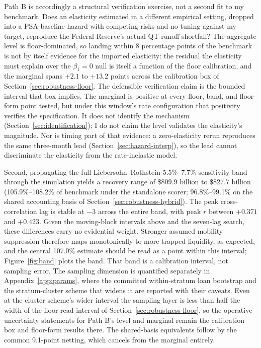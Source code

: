 \documentclass[12pt]{article}
\begin{document}
Path B is accordingly a structural verification exercise, not a second fit to my benchmark. Does an elasticity estimated in a different empirical setting, dropped into a PSA-baseline hazard with competing risks and no tuning against my target, reproduce the Federal Reserve's actual QT runoff shortfall? The aggregate level is floor-dominated, so landing within 8 percentage points of the benchmark is not by itself evidence for the imported elasticity: the residual the elasticity must explain over the $\beta_1 = 0$ null is itself a function of the floor calibration, and the marginal spans $+2.1$ to $+13.2$ points across the calibration box of Section~\ref{sec:robustness-floor}. The defensible verification claim is the bounded interval that box implies. The marginal is positive at every floor, band, and floor-form point tested, but under this window's rate configuration that positivity verifies the specification. It does not identify the mechanism (Section~\ref{sec:identification}); I do not claim the level validates the elasticity's magnitude. Nor is timing part of that evidence: a zero-elasticity rerun reproduces the same three-month lead (Section~\ref{sec:hazard-interp}), so the lead cannot discriminate the elasticity from the rate-inelastic model.

Second, propagating the full Liebersohn--Rothstein 5.5\%--7.7\% sensitivity band through the simulation yields a recovery range of \$809.9 billion to \$827.7 billion (105.9\%--108.2\% of benchmark under the standalone scorer; 96.8\%--99.1\% on the shared accounting basis of Section~\ref{sec:robustness-hybrid}). The peak cross-correlation lag is stable at $-3$ across the entire band, with peak $r$ between $+0.371$ and $+0.423$. Given the moving-block intervals above and the seven-lag search, these differences carry no evidential weight. Stronger assumed mobility suppression therefore maps monotonically to more trapped liquidity, as expected, and the central 107.0\% estimate should be read as a point within this interval; Figure~\ref{fig:band} plots the band. That band is a calibration interval, not sampling error. The sampling dimension is quantified separately in Appendix~\ref{app:params}, where the committed within-stratum loan bootstrap and the stratum-cluster scheme that widens it are reported with their caveats. Even at the cluster scheme's wider interval the sampling layer is less than half the width of the floor-read interval of Section~\ref{sec:robustness-floor}, so the operative uncertainty statements for Path B's level and marginal remain the calibration box and floor-form results there. The shared-basis equivalents follow by the common 9.1-point netting, which cancels from the marginal entirely.
\end{document}
